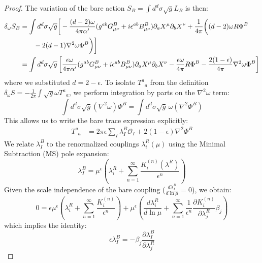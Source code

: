 \begin{tcolorbox}[breakable]
\begin{proof}
		The variation of the bare action $S_B = \int d^d\sigma \sqrt{g} L_B$ is then:
		\begin{align}
			\delta_\omega S_B &= \int d^d\sigma \sqrt{g} \bigg[ -\frac{(d-2)\omega}{4\pi\alpha'} (g^{ab} G^B_{\mu\nu} + i \epsilon^{ab} B^B_{\mu\nu}) \partial_a X^\mu \partial_b X^\nu + \frac{1}{4\pi} \bigg( (d-2)\omega R \Phi^B \notag\\
			&\qquad- 2(d-1) \nabla^2 \omega \Phi^B \bigg) \bigg] \notag \\
			&= \int d^d\sigma \sqrt{g} \left[ \frac{\epsilon\omega}{4\pi\alpha'} (g^{ab} G^B_{\mu\nu} + i \epsilon^{ab} B^B_{\mu\nu}) \partial_a X^\mu \partial_b X^\nu - \frac{\epsilon \omega}{4\pi} R \Phi^B - \frac{2(1-\epsilon)}{4\pi} \nabla^2 \omega \Phi^B \right]
		\end{align}
		where we substituted $d = 2 - \epsilon$. To isolate $T^a{}_a$ from the definition $\delta_\omega S = -\frac{1}{2\pi} \int \sqrt{g} \omega T^a{}_a$, we perform integration by parts on the $\nabla^2 \omega$ term:
		\begin{equation}
			\int d^d\sigma \sqrt{g} (\nabla^2 \omega) \Phi^B = \int d^d\sigma \sqrt{g} \, \omega (\nabla^2 \Phi^B)
		\end{equation}
		This allows us to write the bare trace expression explicitly:
		\begin{align}
			T^a_{\phantom{a}a} &= 2\pi \epsilon \sum_I \lambda_I^B \mathcal{O}_I + 2(1-\epsilon) \nabla^2 \Phi^B
		\end{align}
		We relate $\lambda_I^B$ to the renormalized couplings $\lambda_i^R(\mu)$ using the Minimal Subtraction (MS) pole expansion:
		\begin{equation}
			\lambda_I^B = \mu^\epsilon \left( \lambda_i^R + \sum_{n=1}^\infty \frac{K_i^{(n)}(\lambda^R)}{\epsilon^n} \right)
		\end{equation}
		Given the scale independence of the bare coupling ($\frac{d \lambda_I^B}{d \ln \mu} = 0$), we obtain:
		\begin{equation}
			0 = \epsilon \mu^\epsilon \left( \lambda_i^R + \sum_{n=1}^\infty \frac{K_i^{(n)}}{\epsilon^n} \right) + \mu^\epsilon \left( \frac{d \lambda_i^R}{d \ln \mu} + \sum_{n=1}^\infty \frac{1}{\epsilon^n} \frac{\partial K_i^{(n)}}{\partial \lambda_j^R} \beta_j \right)
		\end{equation}
		which implies the identity:
		\begin{equation}
			\epsilon \lambda_I^B = -\beta_j \frac{\partial \lambda_I^B}{\partial \lambda_j^R}
		\end{equation}

\end{proof}
\end{tcolorbox}
